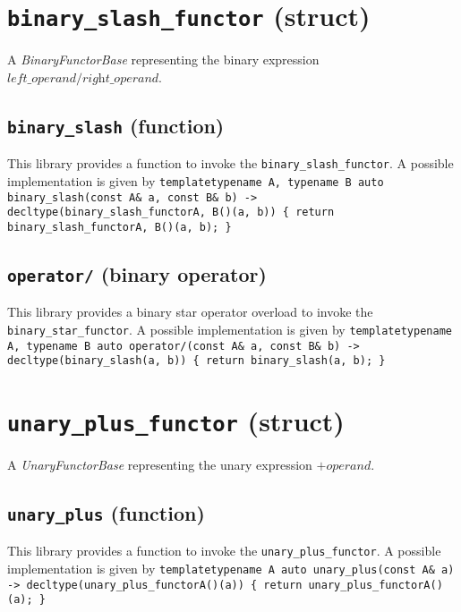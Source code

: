 \documentclass[oneside]{book}
\begin{document}
\section{\texttt{binary\_slash\_functor} (struct)}
A \textit{BinaryFunctorBase} representing the binary expression $\textit{left\_operand} / \textit{right\_operand}$.\newline

\subsection{\texttt{binary\_slash} (function)}
This library provides a function to invoke the \texttt{binary\_slash\_functor}.
A possible implementation is given by\newline
\texttt{template\textlangle typename A, typename B\textrangle\newline
auto binary\_slash(const A\& a, const B\& b) -> decltype(binary\_slash\_functor\textlangle A, B\textrangle()(a, b))\newline
\{ return binary\_slash\_functor\textlangle A, B\textrangle()(a, b); \}}

\subsection{\texttt{operator/} (binary operator)}
This library provides a binary star operator overload to invoke the \texttt{binary\_star\_functor}.
A possible implementation is given by\newline
\texttt{template\textlangle typename A, typename B\textrangle\newline
auto operator/(const A\& a, const B\& b) -> decltype(binary\_slash(a, b))\newline
\{ return binary\_slash(a, b); \}}

\section{\texttt{unary\_plus\_functor} (struct)}
A \textit{UnaryFunctorBase} representing the unary expression $+\textit{operand}$.\newline

\subsection{\texttt{unary\_plus} (function)}
This library provides a function to invoke the \texttt{unary\_plus\_functor}.
A possible implementation is given by\newline
\texttt{template\textlangle typename A\textrangle\newline
auto unary\_plus(const A\& a) -> decltype(unary\_plus\_functor\textlangle A\textrangle()(a))\newline
\{ return unary\_plus\_functor\textlangle A\textrangle()(a); \}}
\end{document}
